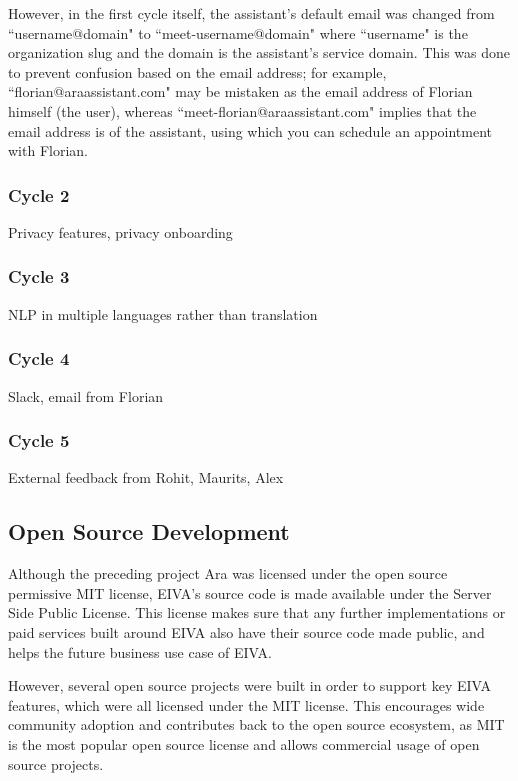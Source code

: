 \documentclass{article}
\begin{document}
However, in the first cycle itself, the assistant's default email was changed from ``username@domain" to ``meet-username@domain" where ``username" is the organization slug and the domain is the assistant's service domain. This was done to prevent confusion based on the email address; for example, ``florian@araassistant.com" may be mistaken as the email address of Florian himself (the user), whereas ``meet-florian@araassistant.com" implies that the email address is of the assistant, using which you can schedule an appointment with Florian.

\subsubsection{Cycle 2}

Privacy features, privacy onboarding

\subsubsection{Cycle 3}

NLP in multiple languages rather than translation \thesubsubsection

\subsubsection{Cycle 4}

Slack, email from Florian

\subsubsection{Cycle 5}

External feedback from Rohit, Maurits, Alex

\subsection{Open Source Development}

Although the preceding project Ara was licensed under the open source permissive MIT license, EIVA's source code is made available under the Server Side Public License. This license makes sure that any further implementations or paid services built around EIVA also have their source code made public, and helps the future business use case of EIVA.

However, several open source projects were built in order to support key EIVA features, which were all licensed under the MIT license. This encourages wide community adoption and contributes back to the open source ecosystem, as MIT is the most popular open source license and allows commercial usage of open source projects.
\end{document}
